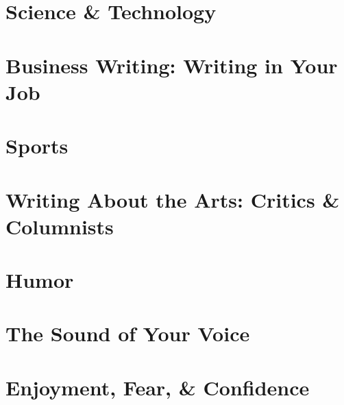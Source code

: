 \documentclass{article}
\begin{document}

\section{Science \& Technology}


\section{Business Writing: Writing in Your Job}


\section{Sports}


\section{Writing About the Arts: Critics \& Columnists}


\section{Humor}


\section{The Sound of Your Voice}


\section{Enjoyment, Fear, \& Confidence}

\end{document}
